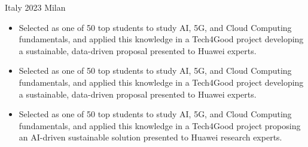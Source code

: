{Italy}
{2023}
{Milan}
{\footnotesize\faCode \hspace{1pt}
}

\begin{itemize}

    \ifde
        \item Selected as one of 50 top students to study AI, 5G, and Cloud Computing fundamentals, and applied this knowledge in a Tech4Good project developing a sustainable, data-driven proposal presented to Huawei experts.
    \else
        \ifhpc
            \item Selected as one of 50 top students to study AI, 5G, and Cloud Computing fundamentals, and applied this knowledge in a Tech4Good project developing a sustainable, data-driven proposal presented to Huawei experts.
        \else
            \item Selected as one of 50 top students to study AI, 5G, and Cloud Computing fundamentals, and applied this knowledge in a Tech4Good project proposing an AI-driven sustainable solution presented to Huawei research experts.
        \fi
    \fi

\end{itemize}

\medskip
